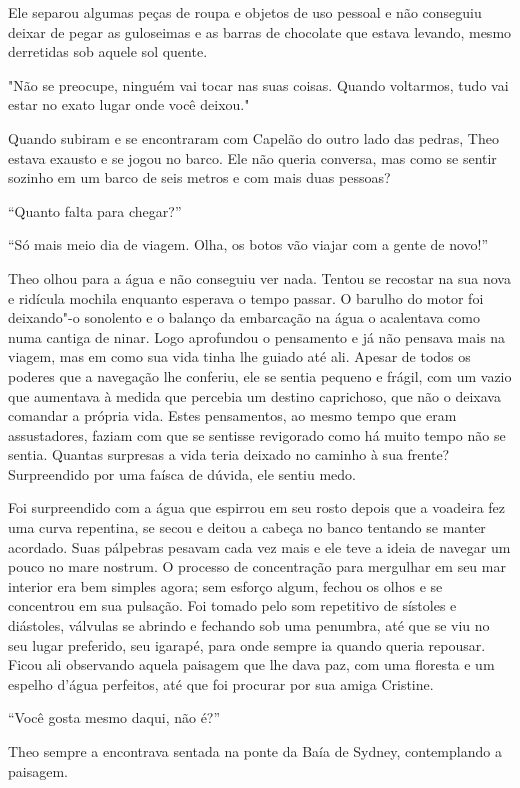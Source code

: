 Ele separou algumas peças de roupa e objetos de uso pessoal e não
conseguiu deixar de pegar as guloseimas e as barras de chocolate que
estava levando, mesmo derretidas sob aquele sol quente.

"Não se preocupe, ninguém vai tocar nas suas coisas. Quando voltarmos,
tudo vai estar no exato lugar onde você deixou."

Quando subiram e se encontraram com Capelão do outro lado das pedras,
Theo estava exausto e se jogou no barco. Ele não queria conversa, mas
como se sentir sozinho em um barco de seis metros e com mais duas
pessoas?

``Quanto falta para chegar?''

``Só mais meio dia de viagem. Olha, os botos vão viajar com a gente de
novo!''

Theo olhou para a água e não conseguiu ver nada. Tentou se recostar na
sua nova e ridícula mochila enquanto esperava o tempo passar. O barulho
do motor foi deixando"-o sonolento e o balanço da embarcação na água o
acalentava como numa cantiga de ninar. Logo aprofundou o pensamento e já
não pensava mais na viagem, mas em como sua vida tinha lhe guiado até
ali. Apesar de todos os poderes que a navegação lhe conferiu, ele se
sentia pequeno e frágil, com um vazio que aumentava à medida que
percebia um destino caprichoso, que não o deixava comandar a própria
vida. Estes pensamentos, ao mesmo tempo que eram assustadores, faziam
com que se sentisse revigorado como há muito tempo não se sentia.
Quantas surpresas a vida teria deixado no caminho à sua frente?
Surpreendido por uma faísca de dúvida, ele sentiu medo.

Foi surpreendido com a água que espirrou em seu rosto depois que a
voadeira fez uma curva repentina, se secou e deitou a cabeça no banco
tentando se manter acordado. Suas pálpebras pesavam cada vez mais e ele
teve a ideia de navegar um pouco no mare nostrum. O processo de
concentração para mergulhar em seu mar interior era bem simples agora;
sem esforço algum, fechou os olhos e se concentrou em sua pulsação. Foi
tomado pelo som repetitivo de sístoles e diástoles, válvulas se abrindo
e fechando sob uma penumbra, até que se viu no seu lugar preferido, seu
igarapé, para onde sempre ia quando queria repousar. Ficou ali
observando aquela paisagem que lhe dava paz, com uma floresta e um
espelho d'água perfeitos, até que foi procurar por sua amiga Cristine.

``Você gosta mesmo daqui, não é?''

Theo sempre a encontrava sentada na ponte da Baía de Sydney,
contemplando a paisagem.

